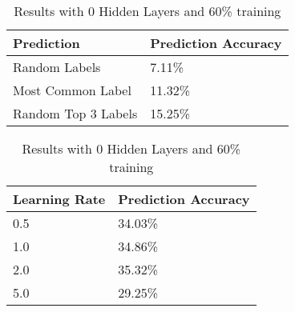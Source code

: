 \documentclass[11pt,letterpaper]{article}
\begin{document}
\begin{table}[ht]
\centering
\caption{Baseline Results}
\begin{tabular}{|l|l|}
\hline
Prediction & Prediction Accuracy \\ \hline
Random Labels        & 7.11\%             \\
Most Common Label    & 11.32\%             \\
Random Top 3 Labels  & 15.25\%             \\
\hline
\end{tabular}

\centering
\caption{Results with 0 Hidden Layers and 60\% training}
\begin{tabular}{|l|l|}
\hline
Learning Rate & Prediction Accuracy \\ \hline
0.5           &  34.03\%           \\
1.0           &  34.86\%           \\
2.0           &  35.32\%           \\
5.0           &  29.25\%              \\
\hline
\end{tabular}

\end{table}
\end{document}
